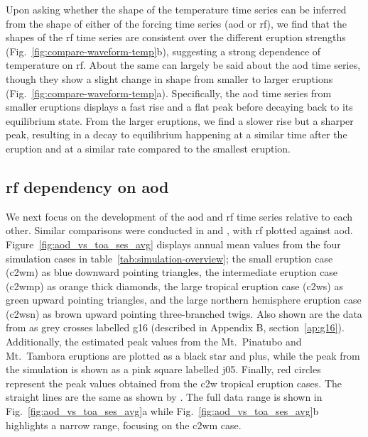 \documentclass{ametsocV6.1}
\begin{document}
Upon asking whether the shape of the temperature time series can be inferred from the
shape of either of the forcing time series (\gls{aod} or \gls{rf}), we find that the
shapes of the \gls{rf} time series are consistent over the different eruption strengths
(Fig.~\ref{fig:compare-waveform-temp}b), suggesting a strong dependence of temperature
on \gls{rf}. About the same can largely be said about the \gls{aod} time series, though
they show a slight change in shape from smaller to larger eruptions
(Fig.~\ref{fig:compare-waveform-temp}a). Specifically, the \gls{aod} time series from
smaller eruptions displays a fast rise and a flat peak before decaying back to its
equilibrium state. From the larger eruptions, we find a slower rise but a sharper peak,
resulting in a decay to equilibrium happening at a similar time after the eruption and
at a similar rate compared to the smallest eruption.

\subsection{\gls{rf} dependency on \gls{aod}}

We next focus on the development of the \gls{aod} and \gls{rf} time series relative to
each other. Similar comparisons were conducted in \citet[][their Fig.\ 4]{gregory2016}
and \citet[][their Fig.\ 1]{marshall2020}, with \gls{rf} plotted against \gls{aod}.
Figure~\ref{fig:aod_vs_toa_ses_avg} displays annual mean values from the four simulation
cases in table~\ref{tab:simulation-overview}; the small eruption case (\gls{c2wm}) as
blue downward pointing triangles, the intermediate eruption case (\gls{c2wmp}) as orange
thick diamonds, the large tropical eruption case (\gls{c2ws}) as green upward pointing
triangles, and the large northern hemisphere eruption case (\gls{c2wsn}) as brown upward
pointing three-branched twigs. Also shown are the data from \citet[][Fig.\ 4, black
  crosses from HadCM3 sstPiHistVol]{gregory2016} as grey crosses labelled \gls{g16}
(described in Appendix B, section~\ref{ap:g16}). Additionally, the estimated peak values
from the Mt.\ Pinatubo and Mt.\ Tambora eruptions are plotted as a black star and plus,
while the peak from the \citet{jones2005} simulation is shown as a pink square labelled
\gls{j05}. Finally, red circles represent the peak values obtained from the \gls{c2w}
tropical eruption cases. The straight lines are the same as shown by
\citet{gregory2016}. The full data range is shown in Fig.~\ref{fig:aod_vs_toa_ses_avg}a
while Fig.~\ref{fig:aod_vs_toa_ses_avg}b highlights a narrow range, focusing on the
\gls{c2wm} case.
\end{document}
